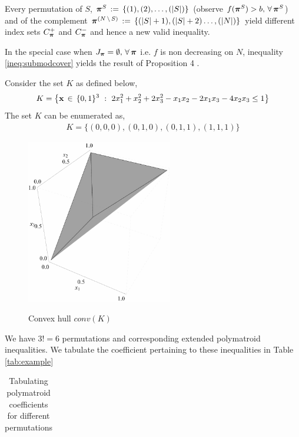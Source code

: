 \documentclass[10pt,twoside]{amsart}
\begin{document}
\begin{rem}
  Every permutation of $S$, $\boldsymbol\pi^S \,:=\, \{(1),(2), \ldots, (|S|)\}$ (observe $f(\boldsymbol\pi^S) > b,\, \forall\,\boldsymbol\pi^S$) and of the complement $\boldsymbol\pi^{(N\,\backslash\, S)} \,:=\, \{(|S|+1),(|S|+2)\ldots,(|N|)\}$ yield different index sets $C^+_{\boldsymbol\pi}$ and $C^-_{\boldsymbol\pi}$ and hence a new valid inequality.
\end{rem}

\begin{rem}
  In the special case when $J_{\boldsymbol\pi} = \emptyset,\, \forall\, \boldsymbol\pi$ i.e. $f$ is non decreasing on $N$, inequality \eqref{ineq:submodcover} yields the result of Proposition 4 \cite{Atamturk2009333}.
\end{rem}

\begin{example}
  Consider the set $K$ as defined below,
  \begin{align*}
    K = \left\{ {\mathbf{x} \,\in\, \{0,1\}^3} \ : \ {2x_1^2 + x_2^2 + 2x_3^2 - x_1x_2 - 2x_1x_3 - 4x_2x_3 \leq 1} \right\}
  \end{align*}
  The set $K$ can be enumerated as,
  \begin{align*}
    K = \{(0,0,0),(0,1,0), (0,1,1), (1,1,1)\}
  \end{align*}
\begin{figure}[h!]
  \centering
  \includegraphics[width=2.5in]{ex1}\\
  \caption{Convex hull $conv(K)$}\label{Fig:Example1}
\end{figure}
We have $3! = 6$ permutations and corresponding extended polymatroid inequalities. We tabulate the coefficient pertaining to these inequalities in Table \ref{tab:example}
\begin{table}[htbp]
  \centering
  \caption{Tabulating polymatroid coefficients for different permutations}
    \begin{tabular}{c|ccc|ccc}

\end{tabular}
\end{table}
\end{example}
\end{document}
